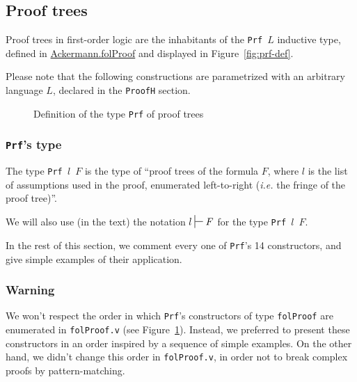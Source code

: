 \subsection{Proof trees}

Proof trees in first-order logic are the inhabitants of the \texttt{Prf $L$} 
inductive type, defined in \href{../theories/html/hydras.Ackermann.folProof.html}{Ackermann.folProof} and displayed in Figure~\vref{fig:prf-def}.





Please note that the following constructions are parametrized with an
arbitrary language $L$, declared in the \texttt{ProofH} section. 


\begin{figure}[p]
  \centering
{}  
  \caption{Definition of the type \texttt{Prf} of proof trees}
  \label{fig:prf-def}
\end{figure}



\subsubsection{\texttt{Prf}'s type}

The type  \texttt{Prf $l$ $F$}  is the type of ``proof trees of the formula $F$, where $l$ is the list of assumptions used in the proof, enumerated left-to-right (\emph{i.e.} the fringe of the proof tree)''.

We will also use (in the text) the notation $l \hdash{} F$ for the type \texttt{Prf $l$ $F$}.


In the rest of this section, we comment  every one of 
\texttt{Prf}'s 14 constructors,
 and give simple examples of their application.

\subsubsection{Warning}

We won't respect the order in which \texttt{Prf}'s constructors
of type \texttt{folProof}  
are enumerated in \texttt{folProof.v} (see Figure~\ref{fig:prf-def}). 
Instead, we preferred to present 
these constructors in an order inspired by a sequence
 of simple examples. On the other hand, we didn't change this order in 
\texttt{folProof.v}, in order not to break complex proofs by pattern-matching.

